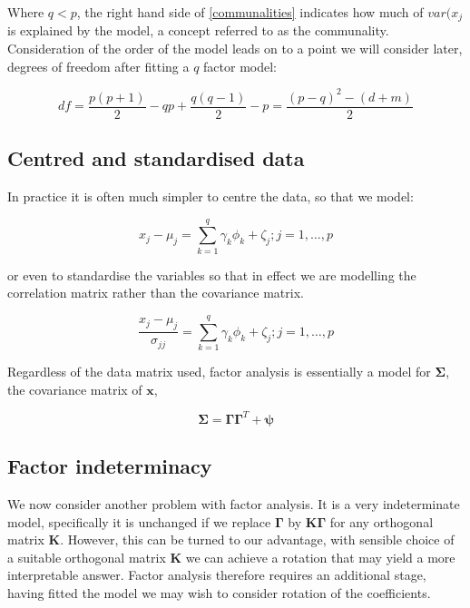 Where $q<p$, the right hand side of \ref{communalities} indicates how much of $var(x_{j}$ is explained by the model, a concept referred to as the communality.   Consideration of the order of the model leads on to a point we will consider later, degrees of freedom after fitting a $q$ factor model:

\begin{equation}
\label{dffact}
df = \frac{p(p+1)}{2} - qp + \frac{q(q-1)}{2} - p = \frac{(p-q)^{2} - (d+m)}{2}
\end{equation}


\subsection{Centred and standardised data}

In practice it is often much simpler to centre the data, so that we model:

\begin{equation}
\label{facentre}
x_{j} - \mu_{j} = \sum_{k=1}^{q} \gamma_{k} \phi_{k} + \zeta_{j}; j = 1, \ldots, p
\end{equation}

or even to standardise the variables so that in effect we are modelling the correlation matrix rather than the covariance matrix.   

\begin{equation}
\label{fastandardise}
\frac{x_{j} - \mu_{j}}{\sigma_{jj}} = \sum_{k=1}^{q} \gamma_{k} \phi_{k} + \zeta_{j}; j = 1, \ldots, p
\end{equation}


Regardless of the data matrix used, factor analysis is essentially a model for $\boldsymbol{\Sigma}$, the covariance matrix of $\boldsymbol{x}$, 

\begin{displaymath}
\label{covdecomp}
\boldsymbol{\Sigma} = \boldsymbol{\Gamma}\boldsymbol{\Gamma}^{T} + \boldsymbol{\psi}
\end{displaymath}

\subsection{Factor indeterminacy}

We now consider another problem with factor analysis.   It is a very indeterminate model, specifically it is unchanged if we replace $\boldsymbol{\Gamma}$ by $\boldsymbol{K} \boldsymbol{\Gamma}$ for any orthogonal matrix $\boldsymbol{K}$.   However, this can be turned to our advantage, with sensible choice of a suitable orthogonal matrix $\boldsymbol{K}$ we can achieve a rotation that may yield a more interpretable answer.  Factor analysis therefore requires an additional stage, having fitted the model we may wish to consider rotation of the coefficients.  

